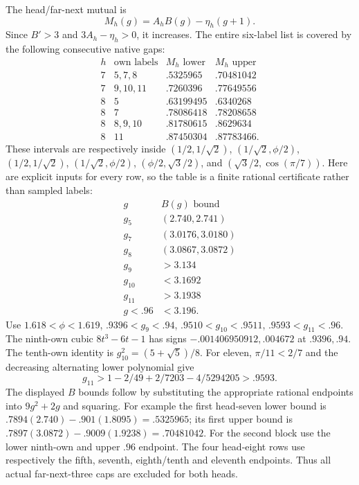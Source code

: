 \documentclass[11pt]{article}
\theoremstyle{definition}
\theoremstyle{remark}
\begin{document}
The head/far-next mutual is
\[
               M_h(g)=A_h B(g)-\eta_h(g+1).
\]
Since \(B'>3\) and \(3A_h-\eta_h>0\), it increases.
The entire six-label list is covered by the following consecutive
native gaps:
\[
\begin{array}{c|c|c|c}
h&\text{own labels}&M_h\text{ lower}&M_h\text{ upper}\\ \hline
7&5,7,8&.5325965&.70481042\\
7&9,10,11&.7260396&.77649556\\
8&5&.63199495&.6340268\\
8&7&.78086418&.78208658\\
8&8,9,10&.81780615&.8629634\\
8&11&.87450304&.87783466 .
\end{array}
\]
These intervals are respectively inside
\((1/2,1/\sqrt2)\), \((1/\sqrt2,\phi/2)\),
\((1/2,1/\sqrt2)\), \((1/\sqrt2,\phi/2)\),
\((\phi/2,\sqrt3/2)\), and
\((\sqrt3/2,\cos(\pi/7))\).
Here are explicit inputs for every row, so the table is a finite
rational certificate rather than sampled labels:
\[
\begin{array}{c|c}
g&B(g)\text{ bound}\\ \hline
g_5&(2.740,2.741)\\
g_7&(3.0176,3.0180)\\
g_8&(3.0867,3.0872)\\
g_9&>3.134\\
g_{10}&<3.1692\\
g_{11}&>3.1938\\
g<.96&<3.196 .
\end{array}
\]
Use \(1.618<\phi<1.619\),
\(.9396<g_9<.94\), \(.9510<g_{10}<.9511\),
\(.9593<g_{11}<.96\).
The ninth-own cubic \(8t^3-6t-1\) has signs
\(-.001406950912,.004672\) at \(.9396,.94\).
The tenth-own identity is \(g_{10}^2=(5+\sqrt5)/8\).
For eleven,
\(\pi/11<2/7\) and the decreasing alternating lower polynomial give
\[
 g_{11}>1-2/49+2/7203-4/5294205>.9593.
\]
The displayed \(B\) bounds follow by substituting the appropriate
rational endpoints into \(9g^2+2g\) and squaring.
For example the first head-seven lower bound is
\(.7894(2.740)-.901(1.8095)=.5325965\);
its first upper bound is
\(.7897(3.0872)-.9009(1.9238)=.70481042\).
For the second block use the lower ninth-own and upper \(.96\)
endpoint.  The four head-eight rows use respectively
the fifth, seventh, eighth/tenth and eleventh endpoints.
Thus all actual far-next-three caps are excluded for both heads.
\end{document}
